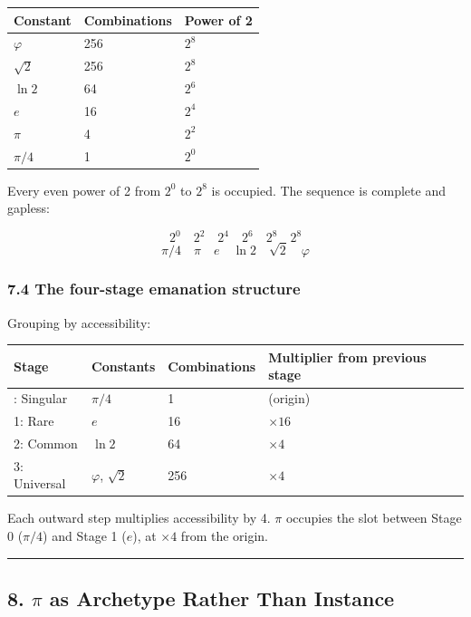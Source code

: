 \documentclass[
  11pt,
  letterpaper,
]{article}
\begin{document}
\begin{longtable}[]{@{}lll@{}}
\toprule\noalign{}
Constant & Combinations & Power of 2 \\
\midrule\noalign{}
\endhead
\bottomrule\noalign{}
\endlastfoot
\(\varphi\) & 256 & \(2^8\) \\
\(\sqrt{2}\) & 256 & \(2^8\) \\
\(\ln 2\) & 64 & \(2^6\) \\
\(e\) & 16 & \(2^4\) \\
\(\pi\) & 4 & \(2^2\) \\
\(\pi/4\) & 1 & \(2^0\) \\
\end{longtable}

Every even power of 2 from \(2^0\) to \(2^8\) is occupied. The sequence
is complete and gapless:

\[
2^0 \quad 2^2 \quad 2^4 \quad 2^6 \quad 2^8 \quad 2^8
\] \[
\pi/4 \quad \pi \quad e \quad \ln 2 \quad \sqrt{2} \quad \varphi
\]

\subsubsection{7.4 The four-stage emanation
structure}\label{the-four-stage-emanation-structure}

Grouping by accessibility:

\begin{longtable}[]{@{}llll@{}}
\toprule\noalign{}
Stage & Constants & Combinations & Multiplier from previous stage \\
\midrule\noalign{}
\endhead
\bottomrule\noalign{}
\endlastfoot
0: Singular & \(\pi/4\) & 1 & (origin) \\
1: Rare & \(e\) & 16 & \(\times 16\) \\
2: Common & \(\ln 2\) & 64 & \(\times 4\) \\
3: Universal & \(\varphi\), \(\sqrt{2}\) & 256 & \(\times 4\) \\
\end{longtable}

Each outward step multiplies accessibility by 4. \(\pi\) occupies the
slot between Stage 0 (\(\pi/4\)) and Stage 1 (\(e\)), at \(\times 4\)
from the origin.

\begin{center}\rule{0.5\linewidth}{0.5pt}\end{center}

\subsection{\texorpdfstring{8. \(\pi\) as Archetype Rather Than
Instance}{8. \textbackslash pi as Archetype Rather Than Instance}}\label{pi-as-archetype-rather-than-instance}
\end{document}
